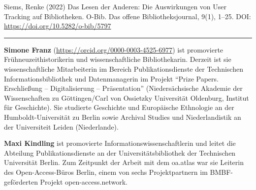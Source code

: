 \documentclass[a4paper,
fontsize=11pt,
oneside,
numbers=noperiodatend,
parskip=half-,
bibliography=totoc,
final
]{scrartcl}
\begin{document}
Siems, Renke (2022) Das Lesen der Anderen: Die Auswirkungen von User
Tracking auf Bibliotheken. O-Bib. Das offene Bibliotheksjournal, 9(1),
1--25. DOI: \url{https://doi.org/10.5282/o-bib/5797}

\begin{center}\rule{0.5\linewidth}{0.5pt}\end{center}

\textbf{Simone Franz} (\url{https://orcid.org/0000-0003-4525-6977}) ist
promovierte Frühneuzeithistorikerin und wissenschaftliche
Bibliothekarin. Derzeit ist sie wissenschaftliche Mitarbeiterin im
Bereich Publikationsdienste der Technischen Informationsbibliothek und
Datenmanagerin im Projekt \enquote{Prize Papers. Erschließung --
Digitalisierung -- Präsentation} (Niedersächsische Akademie der
Wissenschaften zu Göttingen/Carl von Ossietzky Universität Oldenburg,
Institut für Geschichte). Sie studierte Geschichte und Europäische
Ethnologie an der Humboldt-Universität zu Berlin sowie Archival Studies
und Niederlandistik an der Universiteit Leiden (Niederlande).

\textbf{Maxi Kindling} ist promovierte Informationswissenschaftlerin und
leitet die Abteilung Publikationsdienste an der Universitätsbibliothek
der Technischen Universität Berlin. Zum Zeitpunkt der Arbeit mit dem
oa.atlas war sie Leiterin des Open-Access-Büros Berlin, einem von sechs
Projektpartnern im BMBF-geförderten Projekt open-access.network.
\end{document}

